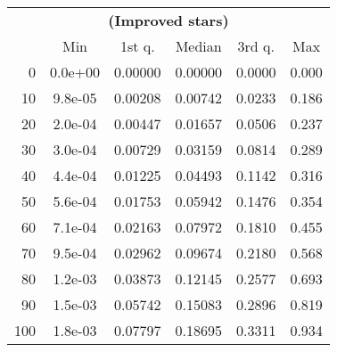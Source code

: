 \begin{tabular}{r|ccccc}
  \multicolumn{6}{c}{{\bf  (Improved stars)}} \\
  & Min & 1st q. & Median & 3rd q. & Max \\ \hline\hline
  0 & 0.0e+00 & 0.00000 & 0.00000 & 0.0000 & 0.000
\\ 10 & 9.8e-05 & 0.00208 & 0.00742 & 0.0233 & 0.186
\\ 20 & 2.0e-04 & 0.00447 & 0.01657 & 0.0506 & 0.237
\\ 30 & 3.0e-04 & 0.00729 & 0.03159 & 0.0814 & 0.289
\\ 40 & 4.4e-04 & 0.01225 & 0.04493 & 0.1142 & 0.316
\\ 50 & 5.6e-04 & 0.01753 & 0.05942 & 0.1476 & 0.354
\\ 60 & 7.1e-04 & 0.02163 & 0.07972 & 0.1810 & 0.455
\\ 70 & 9.5e-04 & 0.02962 & 0.09674 & 0.2180 & 0.568
\\ 80 & 1.2e-03 & 0.03873 & 0.12145 & 0.2577 & 0.693
\\ 90 & 1.5e-03 & 0.05742 & 0.15083 & 0.2896 & 0.819
\\ 100 & 1.8e-03 & 0.07797 & 0.18695 & 0.3311 & 0.934
\end{tabular}

